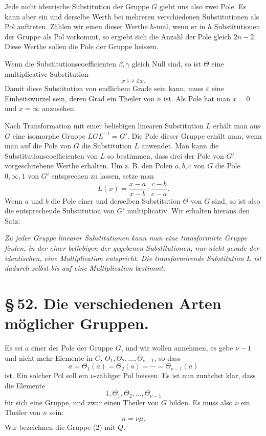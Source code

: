 \documentclass[11pt]{article}
\providecommand{\eps}{\varepsilon}
\providecommand{\eps}{\varepsilon}
\begin{document}
Jede nicht identische Substitution der Gruppe $G$ giebt uns also zwei Pole. Es kann aber ein und derselbe Werth bei mehreren verschiedenen Substitutionen als Pol auftreten. Zählen wir einen dieser Werthe $h$-mal, wenn er in $h$ Substitutionen der Gruppe als Pol vorkommt, so ergiebt sich die Anzahl der Pole gleich $2n-2$. Diese Werthe sollen die Pole der Gruppe heissen.

Wenn die Substitutionscoefficienten $\beta,\gamma$ gleich Null sind, so ist $\Theta$ eine multiplicative Substitution
\[
x\mapsto \eps x.
\]
Damit diese Substitution von endlichem Grade sein kann, muss $\eps$ eine Einheitswurzel sein, deren Grad ein Theiler von $n$ ist. Als Pole hat man $x=0$ und $x=\infty$ anzusehen.

Nach Transformation mit einer beliebigen linearen Substitution $L$ erhält man aus $G$ eine isomorphe Gruppe $LGL^{-1}=G'$. Die Pole dieser Gruppe erhält man, wenn man auf die Pole von $G$ die Substitution $L$ anwendet. Man kann die Substitutionscoefficienten von $L$ so bestimmen, dass drei der Pole von $G'$ vorgeschriebene Werthe erhalten. Um z. B. den Polen $a,b,c$ von $G$ die Pole $0,\infty,1$ von $G'$ entsprechen zu lassen, setze man
\[
L(x)=\frac{x-a}{x-b}\cdot\frac{c-b}{c-a}.
\]
Wenn $a$ und $b$ die Pole einer und derselben Substitution $\Theta$ von $G$ sind, so ist also die entsprechende Substitution von $G'$ multiplicativ. Wir erhalten hieraus den Satz:

\emph{Zu jeder Gruppe linearer Substitutionen kann man eine transformirte Gruppe finden, in der einer beliebigen der gegebenen Substitutionen, nur nicht gerade der identischen, eine Multiplication entspricht. Die transformirende Substitution $L$ ist dadurch selbst bis auf eine Multiplication bestimmt.}

\section*{\S\,52. Die verschiedenen Arten möglicher Gruppen.}

Es sei $a$ einer der Pole der Gruppe $G$, und wir wollen annehmen, es gebe $\nu-1$ und nicht mehr Elemente in $G$, $\Theta_1,\Theta_2,\ldots,\Theta_{\nu-1}$, so dass
\begin{equation}
a=\Theta_1(a)=\Theta_2(a)=\cdots=\Theta_{\nu-1}(a)
\tag{1}
\end{equation}
ist. Ein solcher Pol soll ein $\nu$-zähliger Pol heissen. Es ist nun zunächst klar, dass die Elemente
\begin{equation}
1,\Theta_1,\Theta_2,\ldots,\Theta_{\nu-1}
\tag{2}
\end{equation}
für sich eine Gruppe, und zwar einen Theiler von $G$ bilden. Es muss also $\nu$ ein Theiler von $n$ sein:
\begin{equation}
n=\nu\mu.
\tag{3}
\end{equation}
Wir bezeichnen die Gruppe (2) mit $Q$.
\end{document}
